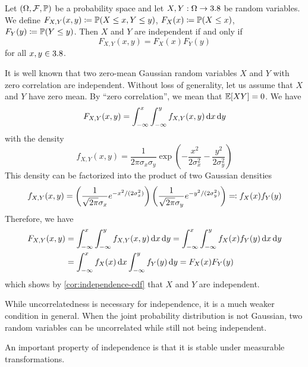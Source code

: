 \begin{corollary}\label{cor:independence-cdf}
Let $(\Omega, \mathcal{F}, \mathbb{P})$ be a probability space and let $X, Y : \Omega \to 3.8$ be random variables.
We define
\(
F_{X,Y}(x,y) \coloneq \mathbb{P}(X \le x, Y \le y)
\),
\(
F_X(x) \coloneq \mathbb{P}(X \le x)
\),
\(
F_Y(y) \coloneq \mathbb{P}(Y \le y)
\).
Then $X$ and $Y$ are independent if and only if
\[
F_{X,Y}(x,y) = F_X(x) F_Y(y)
\]
for all $x,y \in 3.8$.
\end{corollary}

\begin{example}\label{ex:gaussian-random-variables}
It is well known that two zero-mean Gaussian random variables $X$ and $Y$ with zero correlation are independent.
Without loss of generality, let us assume that $X$ and $Y$ have zero mean.
By ``zero correlation'', we mean that $\operatorname{\mathbb{E}}[XY] = 0$.
We have
\[
F_{X,Y}(x,y)
=
\int_{-\infty}^{x}\int_{-\infty}^{y} f_{X,Y}(x,y)\,\mathrm{d} x\,\mathrm{d} y
\]
with the density
\[
f_{X,Y}(x,y)
=
\frac{1}{2\pi\sigma_x\sigma_y}
\exp\left(
-\frac{x^2}{2\sigma_x^2}
-
\frac{y^2}{2\sigma_y^2}
\right)
\]
This density can be factorized into the product of two Gaussian densities
\[
f_{X,Y}(x,y)
=
\left(
\frac{1}{\sqrt{2\pi}\sigma_x}e^{-x^2/(2\sigma_x^2)}
\right)
\left(
\frac{1}{\sqrt{2\pi}\sigma_y}e^{-y^2/(2\sigma_y^2)}
\right)
\eqcolon
f_X(x)f_Y(y)
\]
Therefore, we have
\[
\begin{aligned}
F_{X,Y}(x,y)
&=
\int_{-\infty}^{x}\int_{-\infty}^{y} f_{X,Y}(x,y)\,\mathrm{d} x\,\mathrm{d} y
=
\int_{-\infty}^{x}\int_{-\infty}^{y} f_X(x)f_Y(y)\,\mathrm{d} x\,\mathrm{d} y
\\
&=
\int_{-\infty}^{x} f_X(x)\,\mathrm{d} x
\int_{-\infty}^{y} f_Y(y)\,\mathrm{d} y
=
F_X(x)F_Y(y)
\end{aligned}
\]
which shows by \autoref{cor:independence-cdf} that $X$ and $Y$ are independent.

While uncorrelatedness is necessary for independence, it is a much weaker condition in general.
When the joint probability distribution is not Gaussian, two random variables can be uncorrelated while still not being independent.
\end{example}

An important property of independence is that it is stable under measurable transformations.



